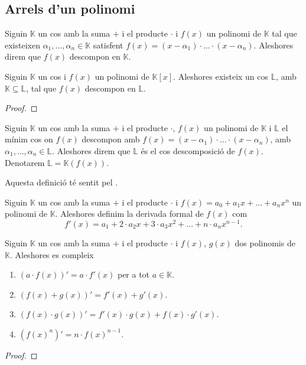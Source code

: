 \documentclass[../Apunts.tex]{subfiles}
\begin{document}
	\subsection{Arrels d'un polinomi}
	\begin{definition}
		\label{def:descomposició d'un polinomi}
		Siguin \(\mathbb{K}\) un cos amb la suma \(+\) i el producte \(\cdot\) i \(f(x)\) un polinomi de \(\mathbb{K}\) tal que existeixen \(\alpha_{1},\dots,\alpha_{n}\in\mathbb{K}\) satisfent \(f(x)=(x-\alpha_{1})\cdot\ldots\cdot(x-\alpha_{n})\). Aleshores direm que \(f(x)\) descompon en \(\mathbb{K}\).
	\end{definition}
	\begin{theorem}
		\label{thm:Teorema de Kronecker}
		Siguin \(\mathbb{K}\) un cos i \(f(x)\) un polinomi de \(\mathbb{K}[x]\). Aleshores existeix un cos \(\mathbb{L}\), amb \(\mathbb{K}\subseteq\mathbb{L}\), tal que \(f(x)\) descompon en \(\mathbb{L}\).
		\begin{proof}
		\end{proof}
	\end{theorem}
	\begin{definition}
		\label{def:cos de descomposició d'un polinomi}
		Siguin \(\mathbb{K}\) un cos amb la suma \(+\) i el producte \(\cdot\), \(f(x)\) un polinomi de \(\mathbb{K}\) i \(\mathbb{L}\) el mínim cos on \(f(x)\) descompon amb \(f(x)=(x-\alpha_{1})\cdot\ldots\cdot(x-\alpha_{n})\), amb \(\alpha_{1},\dots,\alpha_{n}\in\mathbb{L}\). Aleshores direm que \(\mathbb{L}\) és el cos descomposició de \(f(x)\). Denotarem \(\mathbb{L}=\mathbb{K}(f(x))\).
		
		Aquesta definició té sentit pel .
	\end{definition}
	\begin{definition}
		\label{def:derivada formal}
		Siguin \(\mathbb{K}\) un cos amb la suma \(+\) i el producte \(\cdot\) i \(f(x)=a_{0}+a_{1}x+\dots+a_{n}x^{n}\) un polinomi de \(\mathbb{K}\). Aleshores definim la derivada formal de \(f(x)\) com
		\[f'(x)=a_{1}+2\cdot a_{2}x+3\cdot a_{3}x^{2}+\dots+n\cdot a_{n}x^{n-1}.\]
	\end{definition}
	\begin{proposition}
		Siguin \(\mathbb{K}\) un cos amb la suma \(+\) i el producte \(\cdot\) i \(f(x)\), \(g(x)\) dos polinomis de \(\mathbb{K}\). Aleshores es compleix
		\begin{enumerate}
			\item \((a\cdot f(x))'=a\cdot f'(x)\) per a tot \(a\in\mathbb{K}\).
			\item \((f(x)+g(x))'=f'(x)+g'(x)\).
			\item \((f(x)\cdot g(x))'=f'(x)\cdot g(x)+f(x)\cdot g'(x)\).
			\item \({(f(x)^{n})}'=n\cdot f(x)^{n-1}\).
		\end{enumerate}
		\begin{proof}
		\end{proof}
	\end{proposition}
\end{document}
